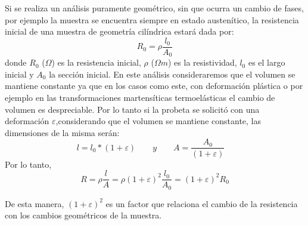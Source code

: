 \documentclass[a4paper,12pt,fleqn,twoside,openany]{book}
\begin{document}
Si se realiza un análisis puramente geométrico, sin que ocurra un cambio de fases, por ejemplo la muestra se encuentra siempre en estado austenítico, la resistencia inicial de una muestra de geometría cilíndrica estará dada por:
\begin{equation}
 R_0= \rho \frac{l_0}{A_0}
\end{equation}
donde $R_0$ ($\Omega$) es la resistencia inicial, $\rho$ ($\Omega m$) es la resistividad, $l_0$ es el largo inicial y $A_0$ la sección inicial. En este análisis consideraremos que el volumen se mantiene constante ya que en los casos como este, con deformación plástica o por ejemplo en las transformaciones martensíticas termoelásticas el cambio de volumen es despreciable. Por lo tanto si la probeta se solicitó con una deformación $\varepsilon$,considerando que el volumen se mantiene constante, las dimensiones de la misma serán: 
\begin{equation*}
 l=l_0 * (1+ \varepsilon)
  \quad \quad y \quad \quad  
 A=\frac{A_0}{(1+ \varepsilon)} \quad 
\end{equation*}
Por lo tanto, 
\begin{equation}
R= \rho \frac{l}{A} = \rho (1+\varepsilon)^2 \frac{l_0}{A_0} = (1+\varepsilon)^2 R_0 %
\end{equation}

De esta manera, $(1+\varepsilon)^2$ es un factor que relaciona el cambio de la resistencia con los cambios geométricos de la muestra. 
\end{document}
